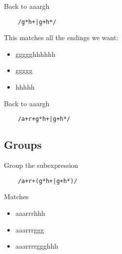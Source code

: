 \documentclass{beamer}
\begin{document}
\begin{frame}[fragile]{Back to aaargh}
  \begin{verbatim}
    /g*h+|g+h*/
  \end{verbatim}
  This matches all the endings we want:
  \begin{itemize}
  \item ggggghhhhhh
  \item ggggg
  \item hhhhh
  \end{itemize}
\end{frame}

\begin{frame}[fragile]{Back to aaargh}
  \begin{verbatim}
    /a+r+g*h+|g+h*/
  \end{verbatim}
\end{frame}

\subsection{Groups}

\begin{frame}[fragile]{Group the subexpression}
  \begin{verbatim}
    /a+r+(g*h+|g+h*)/
  \end{verbatim}
  \begin{block}{Matches}
    \begin{itemize}
    \item aaarrrhhh
    \item aaarrrggg
    \item aaarrrrggghhh
    \end{itemize}
  \end{block}
\end{frame}
\end{document}
